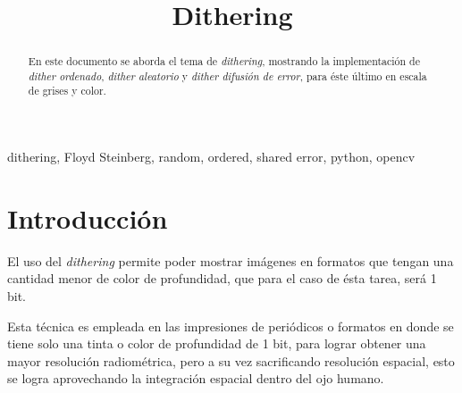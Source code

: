 \documentclass[conference]{IEEEtran}
\begin{document}
\title{Dithering\\
}


\author{
\and
{}

}

\maketitle


\begin{abstract}
En este documento se aborda el tema de \textit{dithering}, mostrando la implementación de \textit{dither ordenado}, \textit{dither aleatorio} y \textit{dither difusión de error}, para éste último en escala de grises y color.
\end{abstract}

\begin{IEEEkeywords}
dithering, Floyd Steinberg, random, ordered, shared error, python, opencv
\end{IEEEkeywords}

\section{Introducción}

El uso del \textit{dithering} permite poder mostrar imágenes en formatos que tengan una cantidad menor de color de profundidad, que para el caso de ésta tarea, será 1 bit.

Esta técnica es empleada en las impresiones de periódicos o formatos en donde se tiene solo una tinta o color de profundidad de 1 bit, para lograr obtener una mayor resolución radiométrica, pero a su vez sacrificando resolución espacial, esto se logra aprovechando la integración espacial dentro del ojo humano\cite{b1}.
\end{document}
